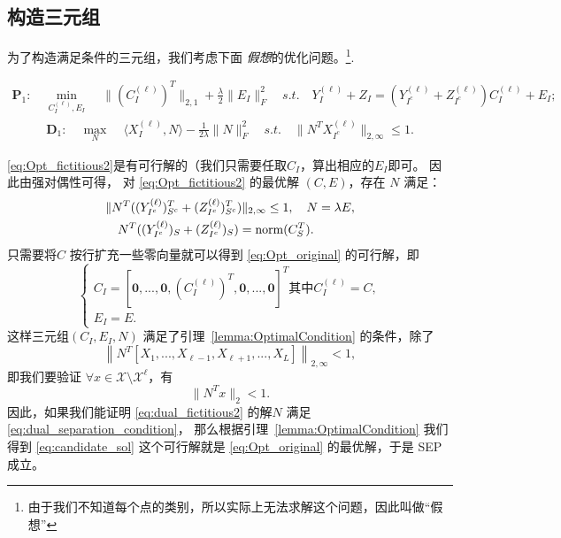 \documentclass[main.tex]{subfiles}
\begin{document}
\subsection{构造三元组}\label{sec:construct_nu}
为了构造满足条件的三元组，我们考虑下面 {\em
假想}的优化问题。\footnote{由于我们不知道每个点的类别，所以实际上无法求解这个问题，因此叫做``假想''}.

\begin{align}\label{eq:Opt_fictitious2}
  \mathbf{P}_1: \quad \min_{C^{(\ell)}_I, E_I} \;
  &\|(C^{(\ell)}_I)^T\|_{2,1}+\frac{\lambda}{2}\|E_I\|_F^2 \quad
  s.t. \quad Y^{(\ell)}_I+Z_I=(Y^{(\ell)}_{I^c}+Z^{(\ell)}_{I^c})C^{(\ell)}_I+E_I;
\end{align}
\begin{align}\label{eq:dual_fictitious2}
  \mathbf{D}_1: \quad \max_{N} \; &\langle X_I^{(\ell)},N \rangle -
  \frac{1}{2\lambda} \|N\|_F^2 \quad
  s.t. \quad \|N^T X^{(\ell)}_{I^c}\|_{2, \infty} \leq 1.
\end{align}

\eqref{eq:Opt_fictitious2}是有可行解的（我们只需要任取$C_I$，算出相应的$E_I$即可。 因此由强对偶性可得， 
对 \eqref{eq:Opt_fictitious2} 的最优解 $(C, E)$，存在 $N$ 满足：
\begin{align*}
  &\|N^T ((Y^{(\ell)}_{I^c})_{S^{c}}^T +(Z^{(\ell)}_{I^c})_{S^{c}}^T)\|_{2, \infty}\leq 1, \quad N=\lambda E, \\
  &\quad N^T ((Y^{(\ell)}_{I^c})_{S} +(Z^{(\ell)}_{I^c})_{S}) =\mathrm{norm}(C_S^T).
\end{align*}
只需要将$C$ 按行扩充一些零向量就可以得到 \eqref{eq:Opt_original} 的可行解，即
\begin{equation}\label{eq:candidate_sol}
\begin{cases}
  C_I= [\mathbf{0},...,\mathbf{0},(C_I^{(\ell)})^T,\mathbf{0},...,\mathbf{0}]^T
  \text{其中} C_I^{(\ell)}=C,\\
    E_I= E.
\end{cases}
\end{equation}
这样三元组$(C_I, E_I, N)$ 满足了引理~\ref{lemma:OptimalCondition} 的条件，除了
\begin{equation*}
    \left\|N^T [X_1,...,X_{\ell-1},X_{\ell+1},...,X_L]\right\|_{2,\infty}<1,
\end{equation*}
即我们要验证 $\forall x \in \mathcal{X}\setminus \mathcal{X}^{\ell}$，有
\begin{equation}\label{eq:dual_separation_condition}
    \| N^T x \|_2 < 1.
\end{equation}
因此，如果我们能证明 \eqref{eq:dual_fictitious2} 的解$N$ 满足 \eqref{eq:dual_separation_condition}，
那么根据引理~\ref{lemma:OptimalCondition} 我们得到 \eqref{eq:candidate_sol}
这个可行解就是 \eqref{eq:Opt_original} 的最优解，于是 SEP 成立。
\end{document}
